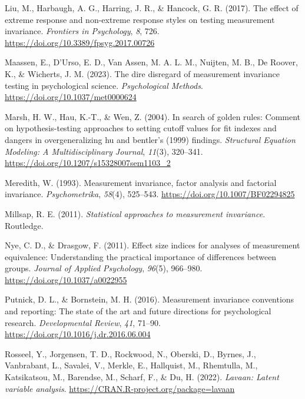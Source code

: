 \documentclass[
  english,
  man]{apa7}
\newlength{\cslhangindent}
\newenvironment{CSLReferences}[2] %
 {\begin{list}{}{%
  \setlength{\itemindent}{0pt}
  \setlength{\leftmargin}{0pt}
  \setlength{\parsep}{0pt}
  \ifodd #1
   \setlength{\leftmargin}{\cslhangindent}
   \setlength{\itemindent}{-1\cslhangindent}
  \fi
  \setlength{\itemsep}{#2\baselineskip}}}
 {\end{list}}
\begin{document}
\begin{CSLReferences}{1}{0}
Liu, M., Harbaugh, A. G., Harring, J. R., \& Hancock, G. R. (2017). The effect of extreme response and non-extreme response styles on testing measurement invariance. \emph{Frontiers in Psychology}, \emph{8}, 726. \url{https://doi.org/10.3389/fpsyg.2017.00726}

Maassen, E., D'Urso, E. D., Van Assen, M. A. L. M., Nuijten, M. B., De Roover, K., \& Wicherts, J. M. (2023). The dire disregard of measurement invariance testing in psychological science. \emph{Psychological Methods}. \url{https://doi.org/10.1037/met0000624}

Marsh, H. W., Hau, K.-T., \& Wen, Z. (2004). In search of golden rules: Comment on hypothesis-testing approaches to setting cutoff values for fit indexes and dangers in overgeneralizing hu and bentler's (1999) findings. \emph{Structural Equation Modeling: A Multidisciplinary Journal}, \emph{11}(3), 320--341. \url{https://doi.org/10.1207/s15328007sem1103_2}

Meredith, W. (1993). Measurement invariance, factor analysis and factorial invariance. \emph{Psychometrika}, \emph{58}(4), 525--543. \url{https://doi.org/10.1007/BF02294825}

Millsap, R. E. (2011). \emph{Statistical approaches to measurement invariance}. Routledge.

Nye, C. D., \& Drasgow, F. (2011). Effect size indices for analyses of measurement equivalence: Understanding the practical importance of differences between groups. \emph{Journal of Applied Psychology}, \emph{96}(5), 966--980. \url{https://doi.org/10.1037/a0022955}

Putnick, D. L., \& Bornstein, M. H. (2016). Measurement invariance conventions and reporting: The state of the art and future directions for psychological research. \emph{Developmental Review}, \emph{41}, 71--90. \url{https://doi.org/10.1016/j.dr.2016.06.004}

Rosseel, Y., Jorgensen, T. D., Rockwood, N., Oberski, D., Byrnes, J., Vanbrabant, L., Savalei, V., Merkle, E., Hallquist, M., Rhemtulla, M., Katsikatsou, M., Barendse, M., Scharf, F., \& Du, H. (2022). \emph{Lavaan: Latent variable analysis}. \url{https://CRAN.R-project.org/package=lavaan}


\end{CSLReferences}
\end{document}
